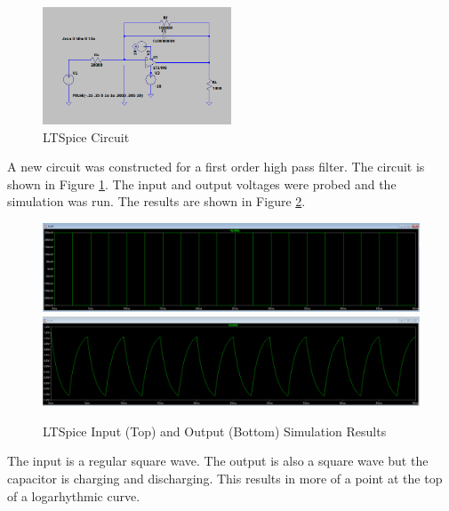 \documentclass[12pt]{article}
\begin{document}
\begin{figure}[H]
  \centering
  \includegraphics[width=0.5\textwidth]{Lab 10 Shared/1.4 circuit.PNG}
  \caption{LTSpice Circuit}
  \label{fig:1.4Circuit}
\end{figure}
A new circuit was constructed for a first order high pass filter.
The circuit is shown in Figure \ref{fig:1.4Circuit}. The input and output
voltages were probed and the simulation was run. The results are shown in
Figure \ref{fig:1.4Results}.
\begin{figure}[H]
  \centering
  \includegraphics[width=1\textwidth]{Lab 10 Shared/1.4 input simulation.PNG} \\
  \includegraphics[width=1\textwidth]{Lab 10 Shared/1.4 output simulation.PNG}
  \caption{LTSpice Input (Top) and Output (Bottom) Simulation Results}
  \label{fig:1.4Results}
\end{figure}
The input is a regular square wave. The output is also a square wave but
the capacitor is charging and discharging. This results in more of a point
at the top of a logarhythmic curve.
\end{document}
